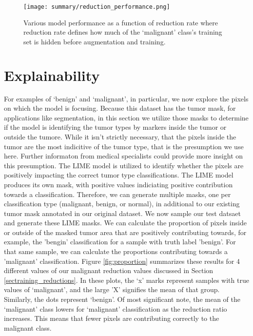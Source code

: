 \documentclass[sn-mathphys,Numbered]{sn-jnl}%
\theoremstyle{thmstyleone}%
\theoremstyle{thmstyletwo}%
\theoremstyle{thmstylethree}%
\begin{document}
\begin{figure}[!htbp]
    \centering

    \texttt{[image: summary/reduction\_performance.png]}

    \caption{Various model performance as a function of reduction rate where reduction rate defines how much of the `malignant' class's training set is hidden before augmentation and training.}
    \label{fig:reduction_performance}
\end{figure}


\section{Explainability}\label{sec_explain}
For examples of `benign' and `malignant', in particular, we now explore the pixels on which the model is focusing.  Because this dataset has the tumor mask, for applications like segmentation, in this section we utilize those masks to determine if the model is identifying the tumor types by markers inside the tumor or outside the tumore.  While it isn't strictly necessary, that the pixels inside the tumor are the most indicitive of the tumor type, that is the presumption we use here.  Further informaton from medical specialists could provide more insight on this presumption.  
The LIME model is utilized to identify whether the pixels are positively impacting the correct tumor type classifications.  The LIME model produces its own mask, with positive values indiciating positive contribution towards a classification.  Therefore, we can generate multiple masks, one per classification type (malignant, benign, or normal), in additional to our existing tumor mask annotated in our original dataset.  
We now sample our test datsaet and generate these LIME masks.  We can calculate the proportion of pixels inside or outside of the masked tumor area that are positively contributing towards, for example, the 'bengin' classification for a sample with truth label 'benign'.  For that same sample, we can calculate the proportions contributing towards a 'malignant' classification.  Figure \ref{fig:proportion} summarizes these results for 4 different values of our malignant reduction values discussed in Section \ref{sectraining_reductions}.  In these plots, the `x' marks represent samples with true values of `malignant', and the large 'X' signifies the mean of that group.  Similarly, the dots represent `benign'.  
Of most significant note, the mean of the `malignant' class lowers for `malignant' classification as the reduction ratio increases.  This means that fewer pixels are contributing correctly to the malignant class. 
\end{document}
